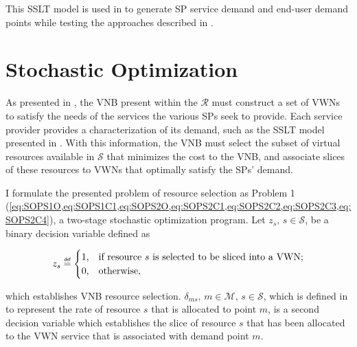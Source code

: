 \documentclass[12pt,dvipsnames]{report}
\newif\ifisdoublespacing
\newcommand\defeq{\mathrel{\overset{\makebox[0pt]{\mbox{\normalfont\tiny\sffamily def}}}{=}}}
\begin{document}
This SSLT model is used in  to generate SP service demand and end-user demand points while testing the approaches described in .

\section{Stochastic Optimization} \label{sec:stochopt}

As presented in , the VNB present within the $\mathcal{R}$ must construct a set of VWNs to satisfy the needs of the services the various SPs seek to provide.  Each service provider provides a characterization of its demand, such as the SSLT model presented in .  With this information, the VNB must select the subset of virtual resources available in $\mathcal{S}$ that minimizes the cost to the VNB, and associate slices of these resources to VWNs that optimally satisfy the SPs' demand.

I formulate the presented problem of resource selection as Problem 1 (\cref{eq:SOPS1O,eq:SOPS1C1,eq:SOPS2O,eq:SOPS2C1,eq:SOPS2C2,eq:SOPS2C3,eq:SOPS2C4}), a two-stage stochastic optimization program.  Let $z_s,\, s \in \mathcal{S}$, be a binary decision variable defined as

\ifisdoublespacing
\begin{singlespacing}
\begin{equation} \label{eq:z_s}
z_s \defeq
	\begin{cases}
		1,& \text{if resource $s$ is selected to be sliced into a VWN;}\\
		\\
		0,& \text{otherwise.}
	\end{cases}
\end{equation}
\end{singlespacing}
\else
\begin{equation} \label{eq:z_s}
z_s \defeq
	\begin{cases}
		1,& \text{if resource $s$ is selected to be sliced into a VWN;}\\
		0,& \text{otherwise,}
	\end{cases}
\end{equation}
\fi

\noindent which establishes VNB resource selection.  $\delta_{ms},\, m \in \mathcal{M},\, s \in \mathcal{S}$, which is defined in  to represent the rate of resource $s$ that is allocated to point $m$, is a second decision variable which establishes the slice of resource $s$ that has been allocated to the VWN service that is associated with demand point $m$.
\end{document}
